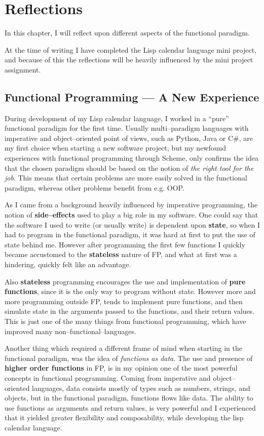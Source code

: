 \chapter{Reflections}
In this chapter, I will reflect upon different aspects of the functional paradigm.

At the time of writing I have completed the Lisp calendar language mini project,
and because of this the reflections will be heavily influenced by the mini project assignment.
\section{Functional Programming --- A New Experience}
During development of my Lisp calendar language, I worked in a ``pure'' functional paradigm for the first time.
Usually multi--paradigm languages with imperative and object--oriented point of views, such as Python, Java or C\#,
are my first choice when starting a new software project;
but my newfound experiences with functional programming through Scheme,
only confirms the idea that the chosen paradigm should be based on the notion of \textit{the right tool for the job}.
This means that certain problems are more easily solved in the functional paradigm, whereas other problems benefit from e.g. OOP.

\medskip
As I came from a background heavily influenced by imperative programming, the notion of \textbf{side--effects} used to play a big role in my software.
One could say that the software I used to write (or usually write) is dependent upon \textbf{state},
so when I had to program in the functional paradigm, it was hard at first to put the use of state behind me.
However after programming the first few functions I quickly became accustomed to the \textbf{stateless} nature of FP,
and what at first was a hindering, quickly felt like an advantage.

\medskip
Also \textbf{stateless} programming encourages the use and implementation of \textbf{pure functions},
since it is the only way to program without state.
However more and more programming outside FP, tends to implement pure functions, and then simulate state in the arguments passed to the functions, and their return values.
This is just one of the many things from functional programming, which have improved many non--functional--languages.

\medskip
Another thing which required a different frame of mind when starting in the functional paradigm, was the idea of \textit{functions as data}.
The use and presence of \textbf{higher order functions} in FP, is in my opinion one of the most powerful concepts in functional programming.
Coming from imperative and object--oriented languages, data consists mostly of types such as numbers, strings, and objects, but in the functional paradigm,
functions flows like data.
The ability to use functions as arguments and return values, is very powerful and I experienced that it yielded greater flexibility and composability,
while developing the lisp calendar language.

